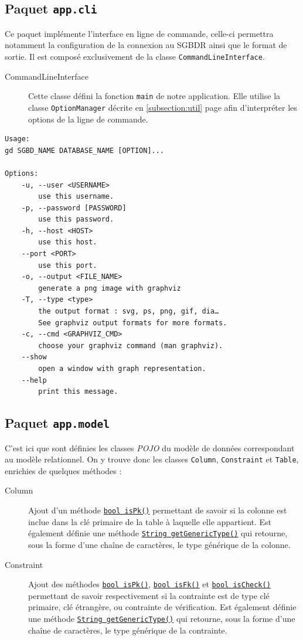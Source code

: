\subsection{Paquet \texttt{app.cli}}

Ce paquet implémente l'interface en ligne de commande, celle-ci permettra notamment la configuration de la connexion au SGBDR ainsi que le format de sortie. Il est composé exclusivement de la classe \texttt{CommandLineInterface}.

\begin{description}
\item[CommandLineInterface] Cette classe défini la fonction \texttt{main} de notre application. Elle utilise la classe \texttt{OptionManager} décrite en \ref{subsection:util} page \pageref{subsection:util} afin d'interpréter les options de la ligne de commande.  
\end{description}

\begin{verbatim}
Usage:
gd SGBD_NAME DATABASE_NAME [OPTION]...

Options:
    -u, --user <USERNAME>
        use this username.
    -p, --password [PASSWORD]
        use this password.
    -h, --host <HOST>
        use this host.
    --port <PORT>
        use this port.
    -o, --output <FILE_NAME>
        generate a png image with graphviz
    -T, --type <type>
        the output format : svg, ps, png, gif, dia… 
        See graphviz output formats for more formats.
    -c, --cmd <GRAPHVIZ_CMD>
        choose your graphviz command (man graphviz).
    --show 
        open a window with graph representation.
    --help
        print this message.
\end{verbatim}


\subsection{Paquet \texttt{app.model}}
C'est ici que sont définies les classes \emph{POJO} du modèle de données correspondant au modèle relationnel. On y trouve donc les classes \texttt{Column}, \texttt{Constraint} et \texttt{Table}, enrichies de quelques méthodes :

\begin{description}

\item[Column] Ajout d'un méthode \texttt{\underline{bool isPk()}} permettant de savoir si la colonne est inclue dans la clé primaire de la table à laquelle elle appartient. Est également définie une méthode \texttt{\underline{String getGenericType()}} qui retourne, sous la forme d'une chaîne de caractères, le type générique de la colonne.

\item[Constraint] Ajout des méthodes \texttt{\underline{bool isPk()}}, \texttt{\underline{bool isFk()}} et \texttt{\underline{bool isCheck()}} permettant de savoir respectivement si la contrainte est de type clé primaire, clé étrangère, ou contrainte de vérification. Est également définie une méthode \texttt{\underline{String getGenericType()}} qui retourne, sous la forme d'une chaîne de caractères, le type générique de la contrainte.
\end{description}

